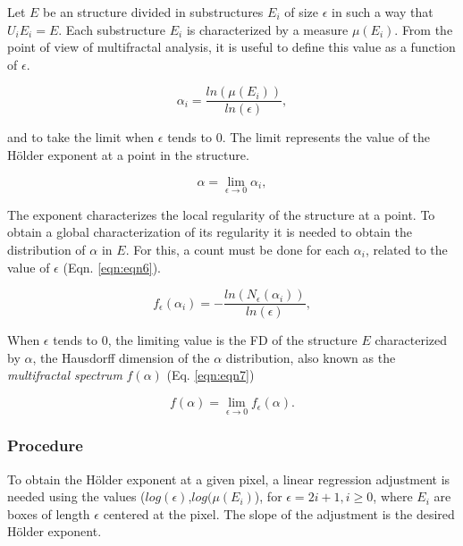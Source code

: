 \documentclass[oneside,a4paper,english,links]{amca}
\begin{document}
Let $E$ be an structure divided in substructures $E_{i}$ of size $\epsilon$ in such a way that $U_{i}E_{i} = E$. Each substructure $E_{i}$ is characterized by a measure $\mu(E_{i})$. From the point of view of multifractal analysis, it is useful to define this value as a function of $\epsilon$.


\begin{equation}
\alpha_{i} = \frac{ln(\mu(E_{i}))}{ln(\epsilon)},
\label{eqn:eqn4}
\end{equation}

and to take the limit when $\epsilon$ tends to $0$. The limit represents the value of the H\"older exponent at a point in the structure.

\begin{equation}
\alpha = \lim_{\epsilon\to0}{\alpha_{i}},
\label{eqn:eqn5}
\end{equation}

The exponent characterizes the local regularity of the structure at a point. To obtain a global characterization of its regularity it is needed to obtain the distribution of $\alpha$ in $E$. For this, a count must be done for each $\alpha_{i}$, related to the value of $\epsilon$ (Eqn. \ref{eqn:eqn6}).

\begin{equation}
f_{\epsilon}(\alpha_{i}) = - \frac{ln(N_{\epsilon}(\alpha_{i}))}{ln(\epsilon)},
\label{eqn:eqn6}
\end{equation}

When $\epsilon$ tends to $0$, the limiting value is the FD of the structure $E$ characterized by $\alpha$, the Hausdorff dimension of the $\alpha$ distribution, also known as the {\em multifractal spectrum} $f(\alpha)$ \cite{Silvetti2010} (Eq. \ref{eqn:eqn7})

\begin{equation}
f(\alpha) = \lim_{\epsilon\to0}{f_{\epsilon}(\alpha)}.
\label{eqn:eqn7}
\end{equation}

\subsubsection*{Procedure}
To obtain the H\"older exponent at a given pixel, a linear regression adjustment is needed using the values ($log(\epsilon)$,$log(\mu(E_{i})$), for $\epsilon = 2i + 1, i \ge 0$, where $E_{i}$ are boxes of length $\epsilon$ centered at the pixel. The slope of the adjustment is the desired H\"older exponent.
\end{document}
